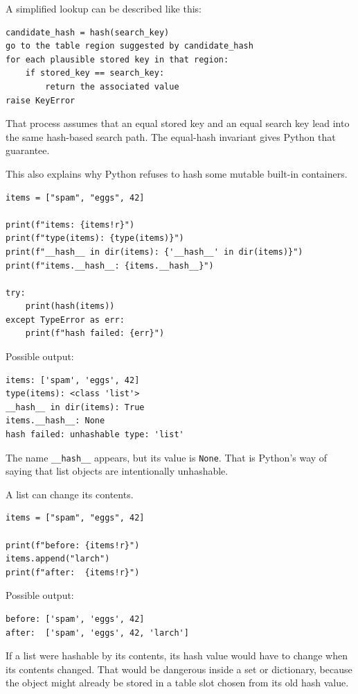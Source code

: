 A simplified lookup can be described like this:

\begin{verbatim}
candidate_hash = hash(search_key)
go to the table region suggested by candidate_hash
for each plausible stored key in that region:
    if stored_key == search_key:
        return the associated value
raise KeyError
\end{verbatim}

That process assumes that an equal stored key and an equal search key lead into the same hash-based search path. The equal-hash invariant gives Python that guarantee.

This also explains why Python refuses to hash some mutable built-in containers.

\begin{verbatim}
items = ["spam", "eggs", 42]

print(f"items: {items!r}")
print(f"type(items): {type(items)}")
print(f"__hash__ in dir(items): {'__hash__' in dir(items)}")
print(f"items.__hash__: {items.__hash__}")

try:
    print(hash(items))
except TypeError as err:
    print(f"hash failed: {err}")
\end{verbatim}

Possible output:

\begin{verbatim}
items: ['spam', 'eggs', 42]
type(items): <class 'list'>
__hash__ in dir(items): True
items.__hash__: None
hash failed: unhashable type: 'list'
\end{verbatim}

The name \texttt{\_\_hash\_\_} appears, but its value is \texttt{None}. That is Python's way of saying that list objects are intentionally unhashable.

A list can change its contents.

\begin{verbatim}
items = ["spam", "eggs", 42]

print(f"before: {items!r}")
items.append("larch")
print(f"after:  {items!r}")
\end{verbatim}

Possible output:

\begin{verbatim}
before: ['spam', 'eggs', 42]
after:  ['spam', 'eggs', 42, 'larch']
\end{verbatim}

If a list were hashable by its contents, its hash value would have to change when its contents changed. That would be dangerous inside a set or dictionary, because the object might already be stored in a table slot chosen from its old hash value.

